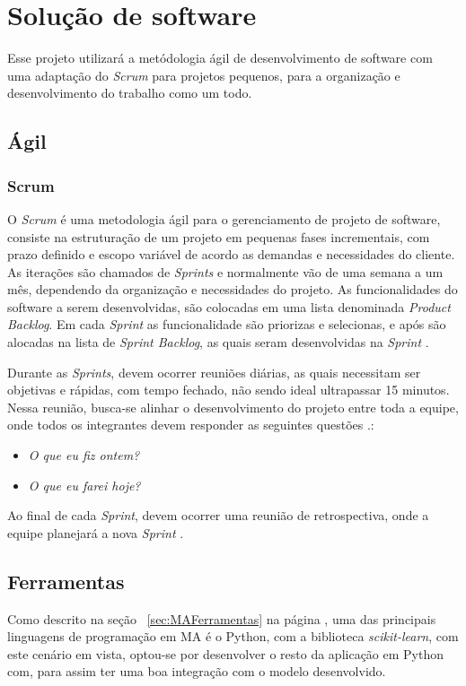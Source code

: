 \chapter[Solução de software]{Solução de software}
Esse projeto utilizará a metódologia ágil de desenvolvimento de software com uma adaptação do \textit{Scrum} para projetos pequenos, para a organização e desenvolvimento do trabalho como um todo.

\section{Ágil}
\subsection{Scrum}
O \textit{Scrum} é uma metodologia ágil para o gerenciamento de projeto de software, consiste na estruturação de um projeto em pequenas fases incrementais, com prazo definido e escopo variável de acordo as demandas e necessidades do cliente. As iterações são chamados de \textit{Sprints} e normalmente vão de uma semana a um mês, dependendo da organização e necessidades do projeto. As funcionalidades do software a serem desenvolvidas, são colocadas em uma lista denominada \textit{Product Backlog}. Em cada \textit{Sprint} as funcionalidade são priorizas e selecionas, e após são alocadas na lista de \textit{Sprint Backlog}, as quais seram desenvolvidas na \textit{Sprint} \cite{sutherland2016scrum}.

Durante as \textit{Sprints}, devem ocorrer reuniões diárias, as quais necessitam ser objetivas e rápidas, com tempo fechado, não sendo ideal ultrapassar 15 minutos. Nessa reunião, busca-se alinhar o desenvolvimento do projeto entre toda a equipe, onde todos os integrantes devem responder as seguintes questões \cite{sutherland2016scrum}.:
\begin{itemize}
    \item \textit{O que eu fiz ontem?}
    \item \textit{O que eu farei hoje?}
\end{itemize}

Ao final de cada \textit{Sprint}, devem ocorrer uma reunião de retrospectiva, onde a equipe planejará a nova \textit{Sprint} \cite{sutherland2016scrum}.

\section{Ferramentas}
Como descrito na seção ~\ref{sec:MAFerramentas} na página \pageref{sec:MAFerramentas}, uma das principais linguagens de programação em MA é o Python, com a biblioteca \textit{scikit-learn}, com este cenário em vista, optou-se por desenvolver o resto da aplicação em Python com, para assim ter uma boa integração com o modelo desenvolvido.

